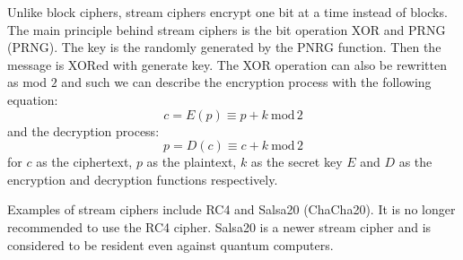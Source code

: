 Unlike block ciphers, stream ciphers encrypt one bit at a time instead of blocks. The main principle behind stream ciphers is the bit operation XOR and PRNG (\acl{PRNG}). The key is the randomly generated by the PNRG function. Then the message is XORed with generate key. The XOR operation can also be rewritten as mod $2$ and such we can describe the encryption process with the following equation:
\begin{equation}
  c = E(p)\equiv p + k\ \mathrm{mod}\,2
\end{equation}
\noindent and the decryption process:
\begin{equation}
  p = D(c)\equiv c + k\ \mathrm{mod}\,2
\end{equation}
\noindent for $c$ as the ciphertext, $p$ as the plaintext, $k$ as the secret key $E$ and $D$ as the encryption and decryption functions respectively\cite{Paar2010}.

Examples of stream ciphers include RC4 and Salsa20 (ChaCha20). It is no longer recommended to use the RC4 cipher. Salsa20 is a newer stream cipher and is considered to be resident even against quantum computers. \cite{Bernstein149}\cite{Ristic2014}

